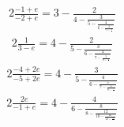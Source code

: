 \documentclass{article}%
\begin{document}
\begin{alignat*}{2}%
\frac{-1 + e}{-2 + e} = 3 - \frac{2}{4 - \frac{3}{5 - \frac{4}{6 - \frac{5}{7 - \frac{6}{..}}}}}%
\end{alignat*}%
\begin{alignat*}{2}%
\frac{1}{3 - e} = 4 - \frac{2}{5 - \frac{3}{6 - \frac{4}{7 - \frac{5}{8 - \frac{6}{..}}}}}%
\end{alignat*}%
\begin{alignat*}{2}%
\frac{-4 + 2 e}{-5 + 2 e} = 4 - \frac{3}{5 - \frac{4}{6 - \frac{5}{7 - \frac{6}{8 - \frac{7}{..}}}}}%
\end{alignat*}%
\begin{alignat*}{2}%
\frac{2 e}{-1 + e} = 4 - \frac{4}{6 - \frac{8}{8 - \frac{12}{10 - \frac{16}{12 - \frac{20}{..}}}}}%
\end{alignat*}

%
\end{document}
